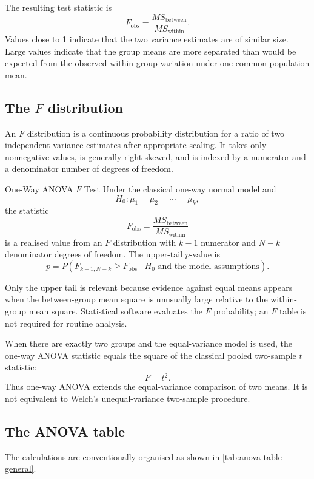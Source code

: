The resulting test statistic is
\[
F_{\mathrm{obs}}
=\frac{MS_{\text{between}}}{MS_{\text{within}}}.
\]
Values close to 1 indicate that the two variance estimates are of similar size. Large values indicate that the group means are more separated than would be expected from the observed within-group variation under one common population mean.

\subsection{The $F$ distribution}

An $F$ distribution is a continuous probability distribution for a ratio of two independent variance estimates after appropriate scaling. It takes only nonnegative values, is generally right-skewed, and is indexed by a numerator and a denominator number of degrees of freedom.

\begin{theorem}{One-Way ANOVA $F$ Test}
Under the classical one-way normal model and
\[
H_0:\mu_1=\mu_2=\cdots=\mu_k,
\]
the statistic
\[
F_{\mathrm{obs}}
=\frac{MS_{\text{between}}}{MS_{\text{within}}}
\]
is a realised value from an $F$ distribution with $k-1$ numerator and $N-k$ denominator degrees of freedom. The upper-tail $p$-value is
\[
p
=P\!\left(
F_{k-1,N-k}\geq F_{\mathrm{obs}}
\mid H_0\text{ and the model assumptions}
\right).
\]
\end{theorem}

Only the upper tail is relevant because evidence against equal means appears when the between-group mean square is unusually large relative to the within-group mean square. Statistical software evaluates the $F$ probability; an $F$ table is not required for routine analysis.

When there are exactly two groups and the equal-variance model is used, the one-way ANOVA statistic equals the square of the classical pooled two-sample $t$ statistic:
\[
F=t^2.
\]
Thus one-way ANOVA extends the equal-variance comparison of two means. It is not equivalent to Welch's unequal-variance two-sample procedure.

\subsection{The ANOVA table}

The calculations are conventionally organised as shown in \autoref{tab:anova-table-general}.

